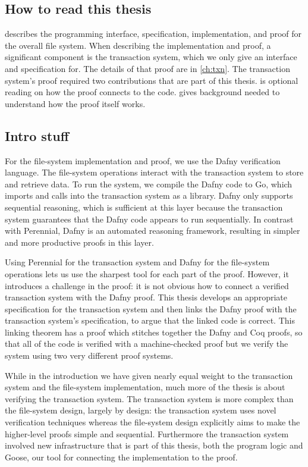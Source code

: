 \subsection{How to read this thesis}

 describes the programming interface, specification,
implementation, and proof for the overall file system. When describing the
implementation and proof, a significant component is the transaction system,
which we only give an interface and specification for. The details of that proof
are in \cref{ch:txn}. The transaction system's proof required two
contributions that are part of this thesis.  is optional
reading on how the proof connects to the code.  gives
background needed to understand how the proof itself works.

\subsection{Intro stuff}

For the file-system implementation and proof, we use the Dafny
verification language. The file-system operations interact with the
transaction system to store and retrieve data. To run the system, we
compile the Dafny code to Go, which imports and calls into the
transaction system as a library. Dafny only supports sequential
reasoning, which is sufficient at this layer because the transaction
system guarantees that the Dafny code appears to run sequentially. In contrast
with Perennial, Dafny is an automated reasoning framework, resulting in simpler
and more productive proofs in this layer.

Using Perennial for the transaction system and Dafny for the file-system
operations lets us use the sharpest tool for each part of the proof. However, it
introduces a challenge in the proof: it is not obvious how to connect a verified
transaction system with the Dafny proof. This thesis develops an appropriate
specification for the transaction system and then links the Dafny proof with the
transaction system's specification, to
argue that the linked code is correct. This linking theorem has a proof which stitches together
the Dafny and Coq proofs, so that all of the code is verified with a
machine-checked proof but we verify the system using two very different proof
systems.

While in the introduction we have given nearly equal weight to the transaction
system and the file-system implementation, much more of the thesis is about
verifying the transaction system. The transaction system is more complex than
the file-system design, largely by design: the transaction system uses novel
verification techniques whereas the file-system
design explicitly aims to make the higher-level proofs simple and sequential.
Furthermore the transaction system involved new infrastructure that is part of
this thesis, both the program logic and Goose, our tool for connecting the
implementation to the proof.


